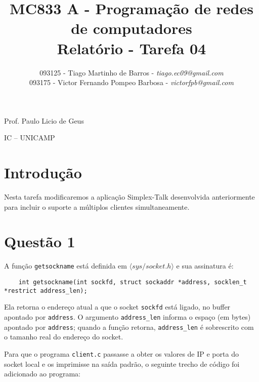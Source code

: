 \documentclass[a4paper,10pt]{article}
\begin{document}


\title{MC833 A - Programação de redes de computadores\\
Relatório - Tarefa 04}

\author {   093125 - Tiago Martinho de Barros - \textit{tiago.ec09@gmail.com}\\
            093175 - Victor Fernando Pompeo Barbosa - \textit{victorfpb@gmail.com}}


\maketitle

\centerline{Prof. Paulo Licio de Geus}
\centerline{IC -- UNICAMP}

\vspace{2cm}
\tableofcontents
    
\newpage
\section{Introdução}
\hspace{14pt}

    Nesta tarefa modificaremos a aplicação Simplex-Talk desenvolvida anteriormente para incluir o suporte a múltiplos clientes simultaneamente.

\section{Questão 1}
A função {\tt getsockname} está definida em $\langle sys/socket.h \rangle$ e sua assinatura é:
    \begin{lstlisting}
    int getsockname(int sockfd, struct sockaddr *address, socklen_t *restrict address_len);
    \end{lstlisting}

Ela retorna o endereço atual a que o socket {\tt sockfd} está ligado, no buffer apontado por {\tt address}. O argumento {\tt address\_len} informa o espaço (em bytes) apontado por {\tt address}; quando a função retorna, {\tt address\_len} é sobrescrito com o tamanho real do endereço do socket.

Para que o programa {\tt client.c} passasse a obter os valores de IP e porta do socket local e os imprimisse na saída padrão, o seguinte trecho de código foi adicionado ao programa:
\end{document}
